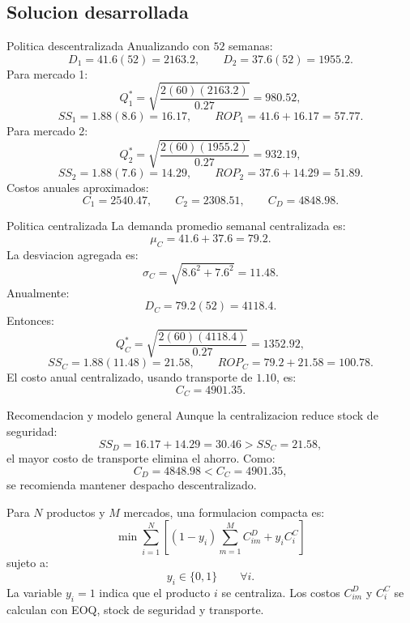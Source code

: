 \subsection{Solucion desarrollada}

\begin{respuesta}{Politica descentralizada}
Anualizando con \(52\) semanas:
\[
D_1=41.6(52)=2163.2,\qquad D_2=37.6(52)=1955.2.
\]
Para mercado 1:
\[
Q_1^*=\sqrt{\frac{2(60)(2163.2)}{0.27}}=980.52,
\]
\[
SS_1=1.88(8.6)=16.17,\qquad ROP_1=41.6+16.17=57.77.
\]
Para mercado 2:
\[
Q_2^*=\sqrt{\frac{2(60)(1955.2)}{0.27}}=932.19,
\]
\[
SS_2=1.88(7.6)=14.29,\qquad ROP_2=37.6+14.29=51.89.
\]
Costos anuales aproximados:
\[
C_1=2540.47,\qquad C_2=2308.51,
\qquad C_D=4848.98.
\]
\end{respuesta}

\begin{respuesta}{Politica centralizada}
La demanda promedio semanal centralizada es:
\[
\mu_C=41.6+37.6=79.2.
\]
La desviacion agregada es:
\[
\sigma_C=\sqrt{8.6^2+7.6^2}=11.48.
\]
Anualmente:
\[
D_C=79.2(52)=4118.4.
\]
Entonces:
\[
Q_C^*=\sqrt{\frac{2(60)(4118.4)}{0.27}}=1352.92,
\]
\[
SS_C=1.88(11.48)=21.58,\qquad ROP_C=79.2+21.58=100.78.
\]
El costo anual centralizado, usando transporte de \(1.10\), es:
\[
C_C=4901.35.
\]
\end{respuesta}

\begin{respuesta}{Recomendacion y modelo general}
Aunque la centralizacion reduce stock de seguridad:
\[
SS_D=16.17+14.29=30.46>SS_C=21.58,
\]
el mayor costo de transporte elimina el ahorro. Como:
\[
C_D=4848.98<C_C=4901.35,
\]
se recomienda mantener despacho descentralizado.

Para \(N\) productos y \(M\) mercados, una formulacion compacta es:
\[
\min \sum_{i=1}^N\left[(1-y_i)\sum_{m=1}^M C_{im}^{D}+y_i C_i^{C}\right]
\]
sujeto a:
\[
y_i\in\{0,1\}\qquad \forall i.
\]
La variable \(y_i=1\) indica que el producto \(i\) se centraliza. Los costos \(C_{im}^{D}\) y \(C_i^C\) se calculan con EOQ, stock de seguridad y transporte.
\end{respuesta}
